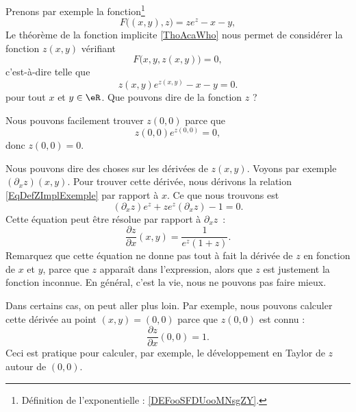 \begin{example} \label{EXooTLNAooCJHPnq}
    Prenons par exemple la fonction\footnote{Définition de l'exponentielle : \ref{DEFooSFDUooMNsgZY}.}
    \begin{equation}
        F\big( (x,y),z \big)=ze^z-x-y,
    \end{equation}
    Le théorème de la fonction implicite \ref{ThoAcaWho} nous permet de considérer la fonction \( z(x,y)\) vérifiant
    \begin{equation}
        F\big( x,y,z(x,y) \big)=0,
    \end{equation}
    c'est-à-dire telle que
    \begin{equation}        \label{EqDefZImplExemple}
        z(x,y) e^{z(x,y)}-x-y=0.
    \end{equation}
    pour tout \( x\) et \( y\in\eR\). Que pouvons dire de la fonction \( z\) ?

    Nous pouvons facilement trouver \( z(0,0)\) parce que
    \begin{equation}
        z(0,0) e^{z(0,0)}=0,
    \end{equation}
    donc \( z(0,0)=0\).

    Nous pouvons dire des choses sur les dérivées de \( z(x,y)\). Voyons par exemple \( (\partial_xz)(x,y)\). Pour trouver cette dérivée, nous dérivons la relation \eqref{EqDefZImplExemple} par rapport à \( x\). Ce que nous trouvons est
    \begin{equation}
        (\partial_xz)e^z+ze^z(\partial_xz)-1=0.
    \end{equation}
    Cette équation peut être résolue par rapport à \( \partial_xz\)~:
    \begin{equation}
        \frac{ \partial z }{ \partial x }(x,y)=\frac{1}{ e^z(1+z) }.
    \end{equation}
    Remarquez que cette équation ne donne pas tout à fait la dérivée de \( z\) en fonction de \( x\) et \( y\), parce que \( z\) apparaît dans l'expression, alors que \( z\) est justement la fonction inconnue. En général, c'est la vie, nous ne pouvons pas faire mieux.

    Dans certains cas, on peut aller plus loin. Par exemple, nous pouvons calculer cette dérivée au point \( (x,y)=(0,0)\) parce que \( z(0,0)\) est connu :
    \begin{equation}
        \frac{ \partial z }{ \partial x }(0,0)=1.
    \end{equation}
    Ceci est pratique pour calculer, par exemple, le développement en Taylor de \( z\) autour de \( (0,0)\).
\end{example}

